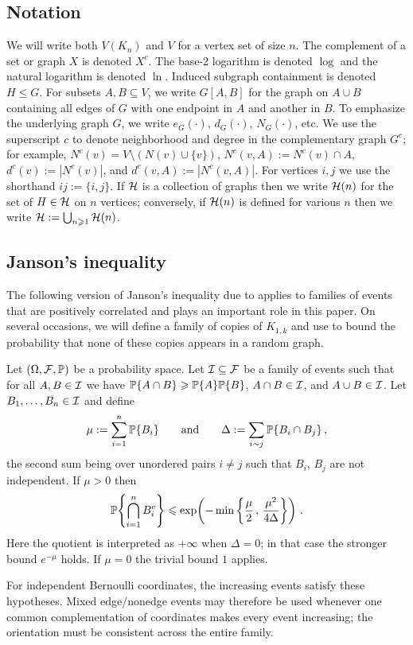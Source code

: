 \subsection{Notation}
We will write both $V(K_n)$ and $V$ for a vertex set of size $n$. The complement of a set or graph $X$ is denoted $X^c$. The base-2 logarithm is denoted $\log$ and the natural logarithm is denoted $\ln$. Induced subgraph containment is denoted $H\leq G$. For subsets $A,B\subseteq V$, we write $G[A,B]$ for the graph on $A\cup B$ containing all edges of $G$ with one endpoint in $A$ and another in $B$. To emphasize the underlying graph $G$, we write $e_G(\cdot)$, $d_G(\cdot)$, $N_G(\cdot)$, etc. We use the superscript $c$ to denote neighborhood and degree in the complementary graph $G^c$; for example, $N^c(v)=V\setminus(N(v)\cup\{v\})$, $N^c(v,A):=N^c(v)\cap A$, $d^c(v):=|N^c(v)|$, and $d^c(v,A):=|N^c(v,A)|$. For vertices $i,j$ we use the shorthand $ij:=\{i,j\}$. If ${\mathcal H}$ is a collection of graphs then we write ${\mathcal H}(n)$ for the set of $H\in{\mathcal H}$ on $n$ vertices; conversely, if ${\mathcal H}(n)$ is defined for various $n$ then we write ${\mathcal H}:=\bigcup_{n\geqslant1}{\mathcal H}(n)$.

\subsection{Janson's inequality}
The following version of Janson's inequality due to \citeauthor{riordan2015janson} \cite{riordan2015janson} applies to families of events that are positively correlated and plays an important role in this paper. On several occasions, we will define a family of copies of $K_{1,k}$ and use  to bound the probability that none of these copies appears in a random graph.

\begin{theorem}\label{thm:JansonsInequality}
Let $(\Omega,{\mathcal F},{\mathbb P})$ be a probability space. Let ${\mathcal I}\subseteq{\mathcal F}$ be a family of events such that for all $A,B\in{\mathcal I}$ we have ${\mathbb P}\{A\cap B\}\geqslant{\mathbb P}\{A\}{\mathbb P}\{B\}$, $A\cap B\in{\mathcal I}$, and $A\cup B\in{\mathcal I}$. Let $B_1,\dots,B_n\in{\mathcal I}$ and define
$$\mu:=\sum_{i=1}^n{\mathbb P}\{B_i\}\hspace{7mm}\text{and}\hspace{7mm}\Delta:=\sum_{i\sim j}{\mathbb P}\{B_i\cap B_j\}\,,$$
the second sum being over unordered pairs $i\neq j$ such that $B_i$, $B_j$ are not independent. If $\mu>0$ then
$${\mathbb P}\!\left\{\bigcap_{i=1}^nB_i^c\right\}\leqslant\exp\!\left(-\min\left\{\frac{\mu}{2}\,,\,\frac{\mu^2}{4\Delta}\right\}\right)\,.$$
Here the quotient is interpreted as $+\infty$ when $\Delta=0$; in that case the stronger bound $e^{-\mu}$ holds. If $\mu=0$ the trivial bound $1$ applies.
\end{theorem}
For independent Bernoulli coordinates, the increasing events satisfy these hypotheses. Mixed edge/nonedge events may therefore be used whenever one common complementation of coordinates makes every event increasing; the orientation must be consistent across the entire family.

